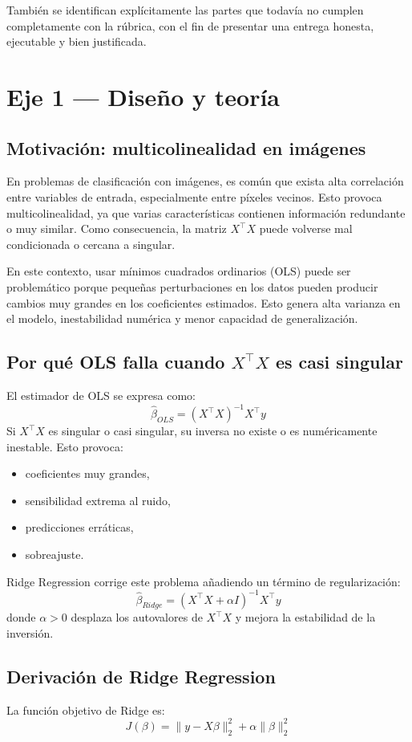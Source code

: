 \documentclass[12pt,a4paper]{article}
\begin{document}
También se identifican explícitamente las partes que todavía no cumplen completamente con la rúbrica, con el fin de presentar una entrega honesta, ejecutable y bien justificada.

\section{Eje 1 --- Diseño y teoría}

\subsection{Motivación: multicolinealidad en imágenes}
En problemas de clasificación con imágenes, es común que exista alta correlación entre variables de entrada, especialmente entre píxeles vecinos. Esto provoca multicolinealidad, ya que varias características contienen información redundante o muy similar. Como consecuencia, la matriz $X^\top X$ puede volverse mal condicionada o cercana a singular.

En este contexto, usar mínimos cuadrados ordinarios (OLS) puede ser problemático porque pequeñas perturbaciones en los datos pueden producir cambios muy grandes en los coeficientes estimados. Esto genera alta varianza en el modelo, inestabilidad numérica y menor capacidad de generalización.

\subsection{Por qué OLS falla cuando $X^\top X$ es casi singular}
El estimador de OLS se expresa como:
\[
\hat{\beta}_{OLS} = (X^\top X)^{-1}X^\top y
\]
Si $X^\top X$ es singular o casi singular, su inversa no existe o es numéricamente inestable. Esto provoca:
\begin{itemize}
    \item coeficientes muy grandes,
    \item sensibilidad extrema al ruido,
    \item predicciones erráticas,
    \item sobreajuste.
\end{itemize}

Ridge Regression corrige este problema añadiendo un término de regularización:
\[
\hat{\beta}_{Ridge} = (X^\top X + \alpha I)^{-1}X^\top y
\]
donde $\alpha > 0$ desplaza los autovalores de $X^\top X$ y mejora la estabilidad de la inversión.

\subsection{Derivación de Ridge Regression}
La función objetivo de Ridge es:
\[
J(\beta) = \|y - X\beta\|_2^2 + \alpha \|\beta\|_2^2
\]
\end{document}
